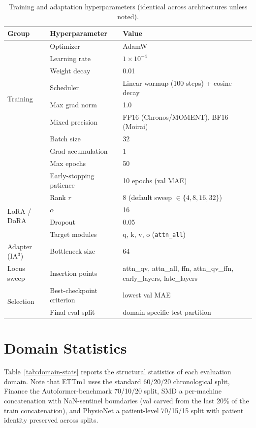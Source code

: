 \begin{table}[ht]
\centering
\caption{Training and adaptation hyperparameters (identical across architectures unless noted).}
\label{tab:hyperparams}
\small
\begin{tabular}{lll}
\toprule
Group & Hyperparameter & Value \\
\midrule
\multirow{8}{*}{Training}
 & Optimizer       & AdamW \\
 & Learning rate   & $1{\times}10^{-4}$ \\
 & Weight decay    & 0.01 \\
 & Scheduler       & Linear warmup (100 steps) + cosine decay \\
 & Max grad norm   & 1.0 \\
 & Mixed precision & FP16 (Chronos/MOMENT), BF16 (Moirai) \\
 & Batch size      & 32 \\
 & Grad accumulation & 1 \\
 & Max epochs      & 50 \\
 & Early-stopping patience & 10 epochs (val MAE) \\
\midrule
\multirow{4}{*}{LoRA / DoRA}
 & Rank $r$        & 8 (default sweep $\in\{4,8,16,32\}$) \\
 & $\alpha$        & 16 \\
 & Dropout         & 0.05 \\
 & Target modules  & q, k, v, o (\texttt{attn\_all}) \\
\midrule
Adapter (IA$^3$) & Bottleneck size & 64 \\
\midrule
Locus sweep & Insertion points & attn\_qv, attn\_all, ffn, attn\_qv\_ffn, early\_layers, late\_layers \\
\midrule
\multirow{2}{*}{Selection}
 & Best-checkpoint criterion & lowest val MAE \\
 & Final eval split          & domain-specific test partition \\
\bottomrule
\end{tabular}
\end{table}

\section{Domain Statistics}
\label{sec:domain-stats}
Table~\ref{tab:domain-stats} reports the structural statistics of each evaluation domain. Note that ETTm1 uses the standard 60/20/20 chronological split, Finance the Autoformer-benchmark 70/10/20 split, SMD a per-machine concatenation with NaN-sentinel boundaries (val carved from the last 20\% of the train concatenation), and PhysioNet a patient-level 70/15/15 split with patient identity preserved across splits.

